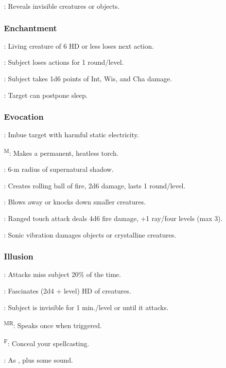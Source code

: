 	: Reveals invisible creatures or objects.

\subsubsection{Enchantment}
	: Living creature of 6 HD or less loses next action.

	: Subject loses actions for 1 round/level.

	: Subject takes 1d6 points of Int, Wis, and Cha damage.

	: Target can postpone sleep. %

\subsubsection{Evocation}
	: Imbue target with harmful static electricity. %

	\textsuperscript{M}: Makes a permanent, heatless torch.

	: 6-m radius of supernatural shadow.

	: Creates rolling ball of fire, 2d6 damage, lasts 1 round/level.

	: Blows away or knocks down smaller creatures.

	: Ranged touch attack deals 4d6 fire damage, +1 ray/four levels (max 3).

	: Sonic vibration damages objects or crystalline creatures.

\subsubsection{Illusion}
	: Attacks miss subject 20\% of the time.

	: Fascinates (2d4 + level) HD of creatures.

	: Subject is invisible for 1 min./level or until it attacks.

	\textsuperscript{MR}: Speaks once when triggered.

	\textsuperscript{F}: Conceal your spellcasting. %

	: As , plus some sound.

